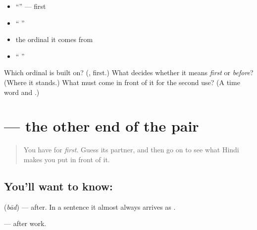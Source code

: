 \begin{itemize}
\raggedright
  \item \textquotedblleft{}\textquotedblright{} — first
  \item \textquotedblleft{}   \textquotedblright{}
  \item the ordinal it comes from
  \item \textquotedblleft{}  \textquotedblright{}
\end{itemize}

\begin{tcolorbox}[breakable,colback=teal!4,colframe=teal!35!black,title={Before you move on}]
Which ordinal is \textbf{} built on? (\textbf{}, first.) What decides whether it means \emph{first} or \emph{before}? (Where it stands.) What must come in front of it for the second use? (A time word and \textbf{}.)
\end{tcolorbox}
\section[\texorpdfstring{\hi{के} \hi{बाद} (ke bād)}{के बाद (ke bād)}]{  — the other end of the pair}

\label{lesson:HI-C90-baad}



\begin{quote}
You have \textbf{} for \emph{first}. Guess its partner, and then go on to see what Hindi makes you put in front of it.
\end{quote}

\subsection*{You'll want to know:  }
\textbf{} (\emph{bād}) — after. In a sentence it almost always arrives as \textbf{ }.

\textbf{  } — after work.

